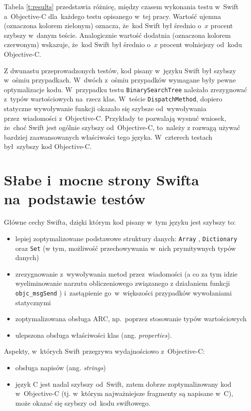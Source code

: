 \documentclass[mgr, shortabstract]{iithesis}
\newcommand{\ang}[1]{ang. \textit{#1}}
\newcommand{\swiftinline}[1]{
    \texttt{#1}
}
\newcommand{\objcinline}[1]{
    \texttt{#1}
}
\begin{document}
Tabela \ref{t:results} przedstawia różnicę, między czasem wykonania testu w~Swift a~Objective-C dla~każdego testu opisanego w~tej pracy. Wartość ujemna (oznaczona kolorem zielonym) oznacza, że~kod Swift był średnio o~$x$ procent szybszy w~danym teście. Analogicznie wartość dodatnia (oznaczona kolorem czerwonym) wskazuje, że~kod Swift był średnio o~$x$ procent wolniejszy od~kodu Objective-C.

Z dwunastu przeprowadzonych testów, kod pisany w~języku Swift był szybszy w~ośmiu przypadkach. W~dwóch z~ośmiu przypadków wymagane były pewne optymalizacje kodu. W~przypadku testu \texttt{BinarySearchTree} należało zrezygnować z~typów wartościowych na~rzecz klas. W~teście \texttt{DispatchMethod}, dopiero statyczne wywoływanie funkcji okazało się szybsze od~wywoływania przez~wiadomości z~Objective-C. Przykłady te pozwalają wysnuć wniosek, że~choć Swift jest ogólnie szybszy od~Objective-C, to~należy z rozwagą używać bardziej zaawansowanych właściwości tego języka. W~czterech testach był szybszy kod Objective-C.

\section{Słabe i~mocne strony Swifta na~podstawie testów}

Główne cechy Swifta, dzięki którym kod pisany w~tym języku jest szybszy to:
\begin{itemize}
    \item lepiej zoptymalizowane podstawowe struktury danych: \swiftinline{Array}, \swiftinline{Dictionary} oraz \swiftinline{Set} (w tym, możliwość przechowywania w~nich prymitywnych typów danych)
    \item zrezygnowanie z~wywoływania metod przez~wiadomości (a co za tym idzie wyeliminowanie narzutu obliczeniowego związanego z działaniem funkcji \objcinline{objc_msgSend}) i~zastąpienie go~w~większości przypadków wywołaniami statycznymi
    \item zoptymalizowana obsługa ARC, np.~poprzez stosowanie typów wartościowych   
    \item ulepszona obsługa właściwości klas (\ang{properties}).
\end{itemize}

Aspekty, w~których Swift przegrywa wydajnościowo z~Objective-C:
\begin{itemize}
    \item obsługa napisów (\ang{strings})
    \item język C jest nadal szybszy od~Swift, zatem dobrze zoptymalizowany kod w~Objective-C (tj. w~którym najważniejsze fragmenty są napisane w~C), może okazać się szybszy od~kodu swiftowego.
\end{itemize}
\end{document}
